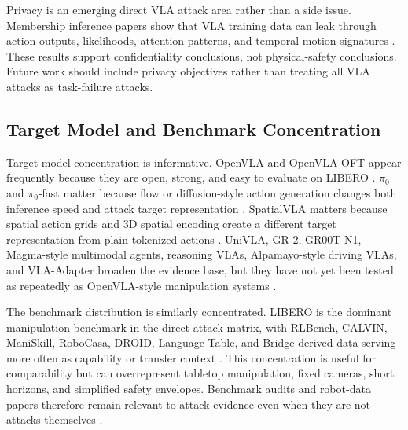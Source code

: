 Privacy is an emerging direct VLA attack area rather than a side issue. Membership inference papers show that VLA training data can leak through action outputs, likelihoods, attention patterns, and temporal motion signatures \cite{peng2026miavla,luan2026vlaleaks}. These results support confidentiality conclusions, not physical-safety conclusions. Future work should include privacy objectives rather than treating all VLA attacks as task-failure attacks.

\subsection{Target Model and Benchmark Concentration}

Target-model concentration is informative. OpenVLA and OpenVLA-OFT appear frequently because they are open, strong, and easy to evaluate on LIBERO \cite{kim24openvla,kim2025openvlaoft,liu2023libero}. $\pi_0$ and $\pi_0$-fast matter because flow or diffusion-style action generation changes both inference speed and attack target representation \cite{black2024pi0,pertsch2025fast}. SpatialVLA matters because spatial action grids and 3D spatial encoding create a different target representation from plain tokenized actions \cite{qu2025spatialvla}. UniVLA, GR-2, GR00T N1, Magma-style multimodal agents, reasoning VLAs, Alpamayo-style driving VLAs, and VLA-Adapter broaden the evidence base, but they have not yet been tested as repeatedly as OpenVLA-style manipulation systems \cite{wang2025unified,cheang2024gr2,nvidia2025gr00tn1,yang2025magma,wang2025vlaadapter} \cite{fu2026vlahijack,huang2026trap,teymoorianfard2026reasonbreak,xu2026silentdrift}.

The benchmark distribution is similarly concentrated. LIBERO is the dominant manipulation benchmark in the direct attack matrix, with RLBench, CALVIN, ManiSkill, RoboCasa, DROID, Language-Table, and Bridge-derived data serving more often as capability or transfer context \cite{james2020rlbench,mees2022calvin,mu2021maniskill,nasiriany2024robocasa,khazatsky2024droid} \cite{lynch2022interactive,walke2023bridgedata,mandlekar2021robomimic,mandlekar2023mimicgen}. This concentration is useful for comparability but can overrepresent tabletop manipulation, fixed cameras, short horizons, and simplified safety envelopes. Benchmark audits and robot-data papers therefore remain relevant to attack evidence even when they are not attacks themselves \cite{jiang2026benchmarkaudit,openx2023,dasari2019robonet,robocasa365}.

